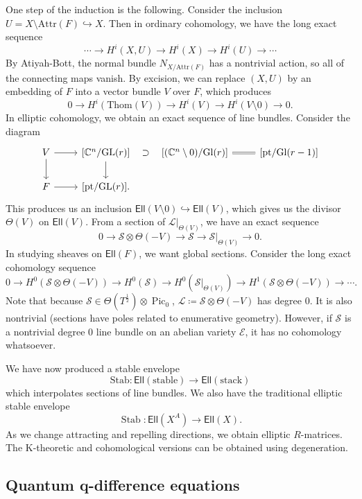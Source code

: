 \documentclass[leqno, openany]{memoir}
\theoremstyle{definition}
\theoremstyle{remark}
\theoremstyle{plain}
\theoremstyle{definition}
\theoremstyle{remark}
\newcommand{\C}{\mathbb{C}}
\newcommand{\mc}[1]{\mathcal{#1}}
\newcommand{\mr}[1]{\mathrm{#1}}
\newcommand{\ms}[1]{\mathsf{#1}}
\newcommand{\on}[1]{\operatorname{#1}}
\DeclareMathOperator{\Pic}{Pic}
\begin{document}
One step of the induction is the following. Consider the inclusion $U = X \setminus \mr{Attr}(F) \hookrightarrow X$. Then in ordinary cohomology, we have the long exact sequence
\[ \cdots \to H^i(X, U) \to H^i(X) \to H^i(U) \to \cdots \]
By Atiyah-Bott, the normal bundle $N_{X/\mr{Attr}(F)}$ has a nontrivial action, so all of the connecting maps vanish. By excision, we can replace $(X, U)$ by an embedding of $F$ into a vector bundle $V$ over $F$, which produces
\[0 \to H^i(\mr{Thom}(V)) \to H^i(V) \to H^i(V \setminus 0) \to 0. \]
In elliptic cohomology, we obtain an exact sequence of line bundles. Consider the diagram
\begin{equation*}
\begin{tikzcd}
    V \ar{d} \ar{r} & { [\C^n/\mr{GL}(r)] } \ar{d}  & { [(\C^n \setminus 0) / \mr{Gl}(r)] } \ar[l, phantom, "\supset"] \ar[equal]{r} & { [\mr{pt}/\mr{Gl}(r-1)] } \\
    F \ar{r} & { [\mr{pt}/\mr{GL}(r)] }.
\end{tikzcd}
\end{equation*}
This produces us an inclusion $\ms{Ell}(V \setminus 0) \hookrightarrow \ms{Ell}(V)$, which gives us the divisor $\Theta(V)$ on $\ms{Ell}(V)$. From a section of $\mc{L} |_{\Theta(V)}$, we have an exact sequence
\[ 0 \to \mc{S} \otimes \Theta(-V) \to \mc{S} \to \mc{S}|_{\Theta(V)} \to 0. \]
In studying sheaves on $\ms{Ell}(F)$, we want global sections. Consider the long exact cohomology sequence
\[ 0 \to H^0(\mc{S} \otimes \Theta(-V)) \to H^0(\mc{S}) \to H^0(\mc{S}|_{\Theta(V)}) \to H^1(\mc{S} \otimes \Theta(-V)) \to \cdots. \]
Note that because $\mc{S} \in \Theta(T^{\frac{1}{2}}) \otimes \Pic_0$, $\mc{L} \coloneqq \mc{S} \otimes \Theta(-V)$ has degree $0$. It is also nontrivial (sections have poles related to enumerative geometry). However, if $\mc{S}$ is a nontrivial degree $0$ line bundle on an abelian variety $\mc{E}$, it has no cohomology whatsoever.

We have now produced a stable envelope
\[ \mr{Stab} \colon \ms{Ell}(\text{stable}) \to \ms{Ell}(\mr{stack}) \]
which interpolates sections of line bundles. We also have the traditional elliptic stable envelope~\cite{ellstab}
\[ \on{Stab} \colon \ms{Ell}(X^A) \to \ms{Ell}(X). \]
As we change attracting and repelling directions, we obtain elliptic $R$-matrices. The K-theoretic and cohomological versions can be obtained using degeneration.

\subsection{Quantum q-difference equations}
\end{document}
